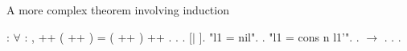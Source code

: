 \documentclass[12pt]{report}
\begin{document}
A more complex theorem involving induction \begin{coqdoccode}
\coqdocnoindent
{}  : \ensuremath{\forall}    : , \coqdoceol
\coqdocindent{1.00em}
 ++ ( ++ ) = ( ++ ) ++ .\coqdoceol
\coqdocnoindent
{}.\coqdoceol
\coqdocindent{1.00em}
   .    [\ensuremath{|}  ].\coqdoceol
\coqdocindent{1.00em}
 "l1 = nil".\coqdoceol
\coqdocindent{2.00em}
.\coqdoceol
\coqdocindent{1.00em}
 "l1 = cons n l1'".\coqdoceol
\coqdocindent{2.00em}
.  \ensuremath{\rightarrow} . . .\coqdoceol
\end{coqdoccode}
\end{document}

